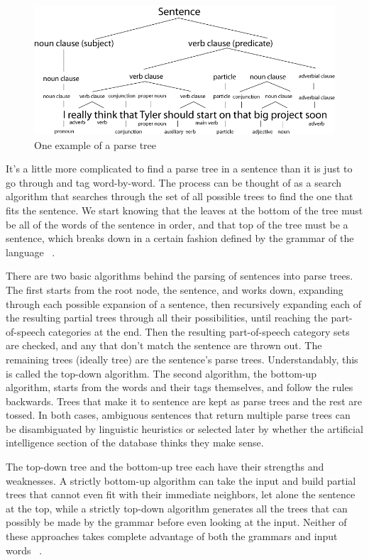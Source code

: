 \documentclass[12pt]{article}
\begin{document}
\begin{figure}[p]
	\centering
		\includegraphics[width=13cm]{Phrase-Tree}
		\caption{One example of a parse tree}
	\label{fig:Phrase-Tree}
\end{figure}

It's a little more complicated to find a parse tree in a sentence than it is just to go through and tag word-by-word. The process can be thought of as a search algorithm that searches through the set of all possible trees to find the one that fits the sentence. We start knowing that the leaves at the bottom of the tree must be all of the words of the sentence in order, and that top of the tree must be a sentence, which breaks down in a certain fashion defined by the grammar of the language ~\citep{Jurafsky}.

There are two basic algorithms behind the parsing of sentences into parse trees. The first starts from the root node, the sentence, and works down, expanding through each possible expansion of a sentence, then recursively expanding each of the resulting partial trees through all their possibilities, until reaching the part-of-speech categories at the end. Then the resulting part-of-speech category sets are checked, and any that don't match the sentence are thrown out. The remaining trees (ideally tree) are the sentence's parse trees. Understandably, this is called the top-down algorithm. The second algorithm, the bottom-up algorithm, starts from the words and their tags themselves, and follow the rules backwards. Trees that make it to sentence are kept as parse trees and the rest are tossed. In both cases, ambiguous sentences that return multiple parse trees can be disambiguated by linguistic heuristics or selected later by whether the artificial intelligence section of the database thinks they make sense. ~\citep{Tomita}

The top-down tree and the bottom-up tree each have their strengths and weaknesses. A strictly bottom-up algorithm can take the input and build partial trees that cannot even fit with their immediate neighbors, let alone the sentence at the top, while a strictly top-down algorithm generates all the trees that can possibly be made by the grammar before even looking at the input. Neither of these approaches takes complete advantage of both the grammars and input words ~\citep{Jurafsky}.
\end{document}
